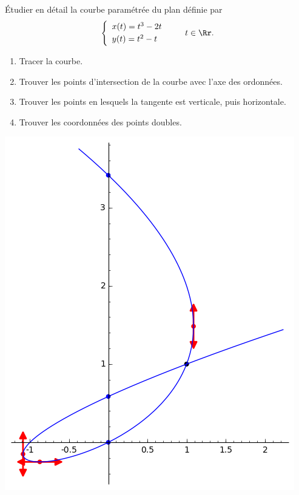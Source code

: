 \documentclass[class=report,crop=false]{standalone}
\begin{document}
\begin{tp}
\'Etudier en détail la courbe paramétrée du plan définie par 
  $$\left\{
  \begin{array}{l}
  x(t) =  t^3-2t\\[1mm]
  y(t) =  t^2-t
  \end{array}
  \right.\qquad  t \in \Rr.$$
\begin{enumerate}
  \item Tracer la courbe.
  
  \item Trouver les points d'intersection de la courbe avec l'axe des ordonnées.
  
  \item Trouver les points en lesquels la tangente est verticale, puis horizontale.
  
  \item Trouver les coordonnées des points doubles.
\end{enumerate}
\end{tp}



\begin{center}
  \includegraphics[scale=0.5]{figures/courbe.png} 
\end{center}
\end{document}
